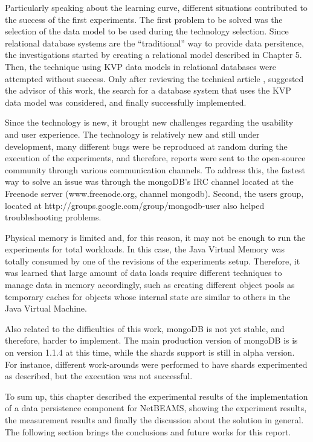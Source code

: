 Particularly speaking about the learning curve, different situations
contributed to the success of the first experiments. The first problem to be
solved was the selection of the data model to be used during the technology
selection. Since relational database systems are the ``traditional'' way to
provide data persitence, the investigations started by creating a relational
model described in Chapter 5. Then, the technique using KVP data models in
relational databases were attempted without success. Only after reviewing the
technical article \cite{db-is-rdbs-dommed}, suggested the advisor of this 
work, the search for a database system that uses the KVP data model was
considered, and finally successfully implemented.

Since the technology is new, it brought new challenges regarding the usability
and user experience. The technology is relatively new and still under development,
many different bugs were be reproduced at random during the execution of
the experiments, and therefore, reports were sent to the open-source community
through various communication channels. To address this, the fastest way to
solve an issue was through the mongoDB's IRC channel located at the Freenode
server (www.freenode.org, channel mongodb). Second, the users group, located at
http://groups.google.com/group/mongodb-user also helped troubleshooting
problems.

Physical memory is limited and, for this reason, it may not be enough to run
the experiments for total workloads. In this case, the Java Virtual Memory was
totally consumed by one of the revisions of the experiments setup. Therefore, 
it was learned that large amount of data loads require different techniques to
manage data in memory accordingly, such as creating different object pools as
temporary caches for objects whose internal state are similar to others in the
Java Virtual Machine.

Also related to the difficulties of this work, mongoDB is not yet stable, and
therefore, harder to implement. The main production version of mongoDB is
is on version 1.1.4 at this time, while the shards support is still in alpha
version. For instance, different work-arounds were performed to have shards
experimented as described, but the execution was not successful.

To sum up, this chapter described the experimental results of the
implementation of a data persistence component for NetBEAMS, showing the
experiment results, the measurement results and finally the discussion about
the solution in general. The following section brings the conclusions and
future works for this report.
